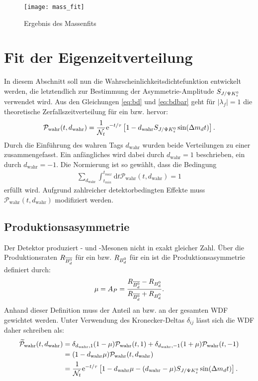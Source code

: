 \begin{figure}[hptb]
\centering
\texttt{[image: mass\_fit]}
\caption{Ergebnis des Massenfits}
\label{fig:fit_masse}
\end{figure}


\section{Fit der Eigenzeitverteilung} \label{kap:eigenzeitverteilung}
In diesem Abschnitt soll nun die Wahrscheinlichkeitsdichtefunktion entwickelt werden, die letztendlich zur Bestimmung der Asymmetrie-Amplitude $S_{J/\Psi K_s^0}$ verwendet wird. Aus den Gleichungen \ref{eq:bd} und \ref{eq:bdbar} geht für $|\lambda_f|=1$ die theoretische Zerfallszeitverteilung für ein \Bd bzw. \Bdbar hervor:
\begin{align}
\mathcal{P}_{\text{wahr}}(t, d_{\text{wahr}}) = \frac{1}{\mathcal{N}_t}\mathrm{e}^{-t/\tau}\left[1-d_{\text{wahr}}S_{J/\Psi K_s^0}\sin(\Delta m_d t)\right].
\end{align}
Durch die Einführung des wahren Tags $d_{\text{wahr}}$ wurden beide Verteilungen zu einer zusammengefasst. Ein anfängliches \Bd wird dabei durch $d_{\text{wahr}}=1$ beschrieben, ein \Bdbar durch $d_{\text{wahr}}=-1$. Die Normierung ist so gewählt, dass die Bedingung
\begin{align}
\sum_{d_{\text{wahr}}}\int_{t_{min}}^{t_{max}}\mathrm{d}t\mathcal{P}_{\text{wahr}}(t, d_{\text{wahr}}) = 1
\end{align}
erfüllt wird. Aufgrund zahlreicher detektorbedingten Effekte muss $\mathcal{P}_{\text{wahr}}(t, d_{\text{wahr}})$ modifiziert werden.

\subsection{Produktionsasymmetrie}
Der Detektor produziert \Bd- und \Bdbar-Mesonen nicht in exakt gleicher Zahl. Über die Produktionsraten $R_{\text{$\overline{B_d^0}$}}$ für ein \Bdbar bzw. $R_{\text{$B_d^0$}}$ für ein \Bd ist die Produktionsasymmetrie definiert durch:
\begin{align}
\mu = A_P = \frac{R_{\text{$\overline{B_d^0}$}}-R_{\text{$B_d^0$}}}{R_{\text{$\overline{B_d^0}$}}+R_{\text{$B_d^0$}}}.
\end{align}
Anhand dieser Definition muss der Anteil an \Bd bzw. \Bdbar an der gesamten WDF gewichtet werden. Unter Verwendung des Kronecker-Deltas $\delta_{ij}$ lässt sich die WDF daher schreiben als:
\begin{align}
\nonumber \widetilde{\mathcal{P}}_{\text{wahr}}(t, d_{\text{wahr}}) &= \delta_{d_{\text{wahr}},1}(1-\mu)\mathcal{P}_{\text{wahr}}(t, 1) + \delta_{d_{\text{wahr}},-1}(1+\mu)\mathcal{P}_{\text{wahr}}(t, -1) \\
\nonumber &= (1-d_{\text{wahr}}\mu)\mathcal{P}_{\text{wahr}}(t, d_{\text{wahr}}) \\
&= \frac{1}{\mathcal{N}_t}\mathrm{e}^{-t/\tau}\left[1-d_{\text{wahr}}\mu - (d_{\text{wahr}}-\mu)S_{J/\Psi K_s^0}\sin(\Delta m_d t)\right].
\end{align}

